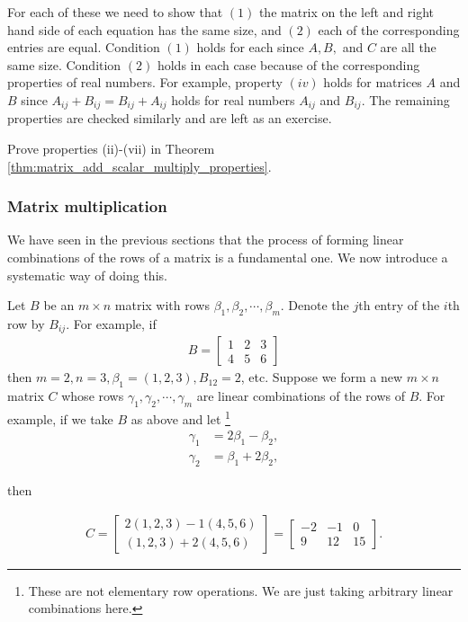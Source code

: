 \documentclass[12pt,letterpaper,reqno]{article}
\numberwithin{equation}{section}
\begin{document}
\begin{pf}
For each of these we need to show that $(1)$ the matrix on the left and right hand side of each equation has the same size, and $(2)$ each of the corresponding entries are equal. Condition $(1)$ holds for each since $A,B,$ and $C$ are all the same size. Condition $(2)$ holds in each case because of the corresponding properties of real numbers. For example, property $(iv)$ holds for matrices $A$ and $B$ since $A_{ij}+B_{ij}=B_{ij}+A_{ij}$ holds for real numbers $A_{ij}$ and $B_{ij}$. The remaining properties are checked similarly and are left as an exercise.
\end{pf}

\begin{exercise}
Prove properties (ii)-(vii) in Theorem \ref{thm:matrix_add_scalar_multiply_properties}.	
\end{exercise}

\subsubsection{Matrix multiplication}\label{sec:matrix_multiplication}
We have seen in the previous sections that the process of forming linear combinations of the rows of a matrix is a fundamental one. We now introduce a systematic way of doing this. 

Let $B$ be an $m \times n$ matrix with rows $\beta_1,\beta_2,\cdots, \beta_m$. Denote the $j$th entry of the $i$th row by $B_{ij}$. For example, if
\begin{align*}
	B=\begin{bmatrix}
		1&2&3 \\ 4&5&6
	\end{bmatrix}
\end{align*}
then $m=2, n=3, \beta_1=(1,2,3), B_{12}=2$, etc. 
Suppose we form a new $m \times n$ matrix $C$ whose rows $\gamma_1,\gamma_2, \cdots, \gamma_m$ are linear combinations of the rows of $B$. For example, if we take $B$ as above and let \footnote{These are not elementary row operations. We are just taking arbitrary linear combinations here.}
\begin{align*}
	\gamma_1&=2\beta_1-\beta_2, \\
	\gamma_2&=\beta_1+2\beta_2,
\end{align*}

then 

\begin{align*}
	C=\begin{bmatrix}
		2(1,2,3)-1(4,5,6) \\
		(1,2,3)+2(4,5,6)
	\end{bmatrix}=\begin{bmatrix}
		-2&-1&0 \\ 9 & 12 & 15
	\end{bmatrix}.
\end{align*}
\end{document}
